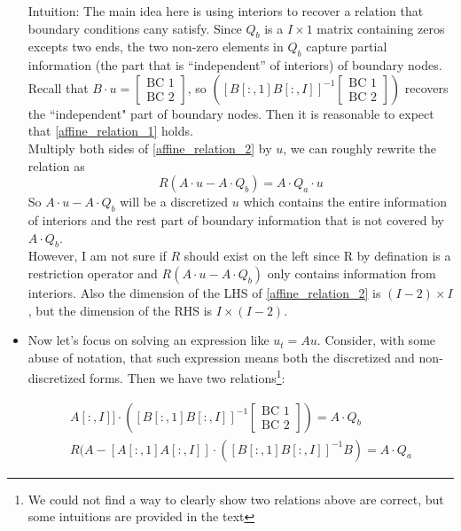 \documentclass[11pt]{article}
\begin{document}
\begin{itemize}
Intuition: The main idea here is using interiors to recover a relation that boundary conditions cany satisfy. Since $Q_b$ is a $I\times 1$ matrix containing zeros excepts two ends, the two non-zero elements in $Q_b$ capture partial information (the part that is ``independent'' of interiors) of boundary nodes.  Recall that $B\cdot u =\begin{bmatrix}
\text{BC 1}\\
\text{BC 2}
\end{bmatrix} $, so $\left([B[:, 1] B[:, I]]^{-1}\begin{bmatrix}
\text{BC 1}\\
\text{BC 2}
\end{bmatrix}\right)$ recovers the ``independent" part of boundary nodes. Then it is reasonable to expect that \eqref{affine_relation_1} holds.\\
Multiply both sides of \eqref{affine_relation_2} by $u$, we can roughly rewrite the relation as
\begin{equation}
R(A\cdot u-A\cdot Q_b) = A\cdot Q_a\cdot u
\end{equation}
So $A\cdot u-A\cdot Q_b$ will be a discretized $u$ which contains the entire information of interiors and the rest part of boundary information that is not covered by $A\cdot Q_b$. \\
However, I am not sure if $R$ should exist on the left since R by defination is a restriction operator and $R(A\cdot u-A\cdot Q_b)$ only contains information from interiors. Also the dimension of the LHS of \eqref{affine_relation_2} is $(I-2)\times I$, but the dimension of the RHS is $I\times (I-2)$.
\fi

\item Now let's focus on solving an expression like $u_t = A u$. Consider, with some abuse of notation, that such expression means both the discretized and non-discretized forms. Then we have two relations\footnote{We could not find a way to clearly show two relations above are correct, but some intuitions are provided in the text}:

\begin{align}
[A[:, 1] A[:, I]]\cdot\left([B[:, 1] B[:, I]]^{-1}\begin{bmatrix}
\text{BC 1}\\
\text{BC 2}
\end{bmatrix}\right) = A\cdot Q_b\label{affine_relation_1}\\
R(A-[A[:, 1] A[:, I]]\cdot([B[:, 1] B[:, I]]^{-1} B) = A\cdot Q_a\label{affine_relation_2}
\end{align}


\end{itemize}
\end{document}
